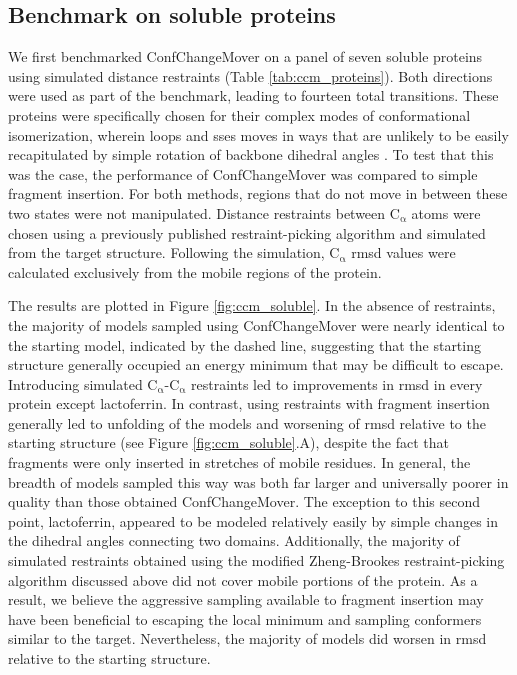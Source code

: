 \subsection{Benchmark on soluble proteins}

We first benchmarked ConfChangeMover on a panel of seven soluble proteins using simulated distance restraints (Table \ref{tab:ccm_proteins}). Both directions were used as part of the benchmark, leading to fourteen total transitions. These proteins were specifically chosen for their complex modes of conformational isomerization, wherein loops and \gls{sse}s moves in ways that are unlikely to be easily recapitulated by simple rotation of backbone dihedral angles \citep*{Dastvan2016a, Krug2016}. To test that this was the case, the performance of ConfChangeMover was compared to simple fragment insertion. For both methods, regions that do not move in between these two states were not manipulated. Distance restraints between $\mathrm{C_{\upalpha}}$ atoms were chosen using a previously published restraint-picking algorithm \citep*{Jeschke2012a, Zheng2005} and simulated from the target structure. Following the simulation, $\mathrm{C_{\upalpha}}$ \gls{rmsd} values were calculated exclusively from the mobile regions of the protein.

The results are plotted in Figure \ref{fig:ccm_soluble}. In the absence of restraints, the majority of models sampled using ConfChangeMover were nearly identical to the starting model, indicated by the dashed line, suggesting that the starting structure generally occupied an energy minimum that may be difficult to escape. Introducing simulated $\mathrm{C_{\upalpha}}$-$\mathrm{C_{\upalpha}}$ restraints led to improvements in \gls{rmsd} in every protein except lactoferrin.  In contrast, using restraints with fragment insertion generally led to unfolding of the models and worsening of \gls{rmsd} relative to the starting structure (see Figure \ref{fig:ccm_soluble}.A), despite the fact that fragments were only inserted in stretches of mobile residues. In general, the breadth of models sampled this way was both far larger and universally poorer in quality than those obtained ConfChangeMover. The exception to this second point, lactoferrin, appeared to be modeled relatively easily by simple changes in the dihedral angles connecting two domains. Additionally, the majority of simulated restraints obtained using the modified Zheng-Brookes restraint-picking algorithm discussed above did not cover mobile portions of the protein. As a result, we believe the aggressive sampling available to fragment insertion may have been beneficial to escaping the local minimum and sampling conformers similar to the target. Nevertheless, the majority of models did worsen in \gls{rmsd} relative to the starting structure.

